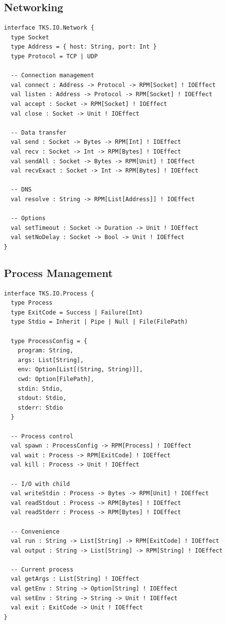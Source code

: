 \subsection{Networking}
\label{subsec:networking}

\begin{definition}
\label{def:network-interface}
\begin{verbatim}
interface TKS.IO.Network {
  type Socket
  type Address = { host: String, port: Int }
  type Protocol = TCP | UDP

  -- Connection management
  val connect : Address -> Protocol -> RPM[Socket] ! IOEffect
  val listen : Address -> Protocol -> RPM[Socket] ! IOEffect
  val accept : Socket -> RPM[Socket] ! IOEffect
  val close : Socket -> Unit ! IOEffect

  -- Data transfer
  val send : Socket -> Bytes -> RPM[Int] ! IOEffect
  val recv : Socket -> Int -> RPM[Bytes] ! IOEffect
  val sendAll : Socket -> Bytes -> RPM[Unit] ! IOEffect
  val recvExact : Socket -> Int -> RPM[Bytes] ! IOEffect

  -- DNS
  val resolve : String -> RPM[List[Address]] ! IOEffect

  -- Options
  val setTimeout : Socket -> Duration -> Unit ! IOEffect
  val setNoDelay : Socket -> Bool -> Unit ! IOEffect
}
\end{verbatim}
\end{definition}

\subsection{Process Management}
\label{subsec:process}

\begin{definition}
\label{def:process-interface}
\begin{verbatim}
interface TKS.IO.Process {
  type Process
  type ExitCode = Success | Failure(Int)
  type Stdio = Inherit | Pipe | Null | File(FilePath)

  type ProcessConfig = {
    program: String,
    args: List[String],
    env: Option[List[(String, String)]],
    cwd: Option[FilePath],
    stdin: Stdio,
    stdout: Stdio,
    stderr: Stdio
  }

  -- Process control
  val spawn : ProcessConfig -> RPM[Process] ! IOEffect
  val wait : Process -> RPM[ExitCode] ! IOEffect
  val kill : Process -> Unit ! IOEffect

  -- I/O with child
  val writeStdin : Process -> Bytes -> RPM[Unit] ! IOEffect
  val readStdout : Process -> RPM[Bytes] ! IOEffect
  val readStderr : Process -> RPM[Bytes] ! IOEffect

  -- Convenience
  val run : String -> List[String] -> RPM[ExitCode] ! IOEffect
  val output : String -> List[String] -> RPM[String] ! IOEffect

  -- Current process
  val getArgs : List[String] ! IOEffect
  val getEnv : String -> Option[String] ! IOEffect
  val setEnv : String -> String -> Unit ! IOEffect
  val exit : ExitCode -> Unit ! IOEffect
}
\end{verbatim}
\end{definition}

